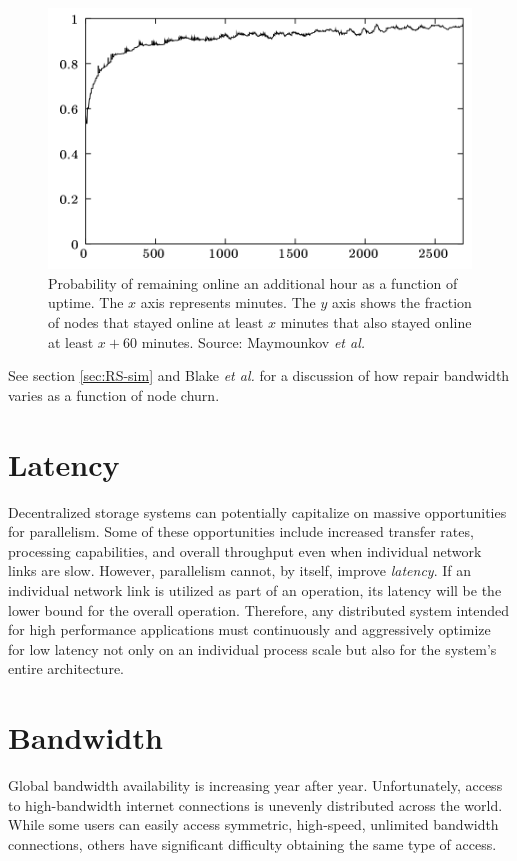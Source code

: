 \documentclass[8pt,fleqn,openany]{book}
\begin{document}
\begin{figure}[!htbp]
\centering
\includegraphics[width=.6\textwidth]{images/uptime.png}
\caption{Probability of remaining online an additional hour as a function of
uptime.
The $x$ axis represents minutes. The $y$ axis shows the fraction of nodes
that stayed online at least $x$ minutes that also stayed online at least
$x+60$ minutes. Source: Maymounkov {\em et al.} \cite{kad}}
\label{fig:kad-uptime}
\end{figure}

See section \ref{sec:RS-sim} and Blake {\em et al.} \cite{pick2-churn} for a
discussion of how repair bandwidth varies as a function of node churn.

\section{Latency}

Decentralized storage systems can potentially capitalize on
massive opportunities for parallelism.
Some of these opportunities include increased transfer rates, processing
capabilities, and overall throughput even when individual
network links are slow. However, parallelism cannot, by itself, improve {\em
latency}. If an individual network link is utilized as part of an operation,
its latency will be the lower bound for the overall operation.
Therefore, any distributed system
intended for high performance applications must continuously and aggressively
optimize for low latency not only on an individual process scale but also for
the system's entire architecture.

\section{Bandwidth}\label{sec:req-bandwidth}

Global bandwidth availability is increasing year after year. Unfortunately,
access to
high-bandwidth internet connections is unevenly distributed across the world.
While some users can easily access symmetric, high-speed, unlimited bandwidth
connections, others have significant difficulty obtaining the same type of
access.
\end{document}
